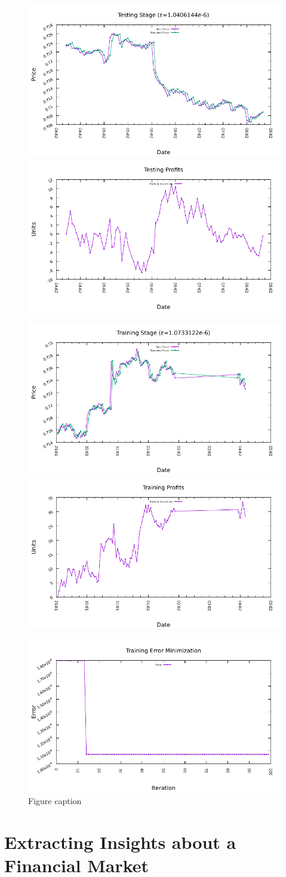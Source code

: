 \begin{figure}[htp]
\centering
\includegraphics[width=.3\textwidth]{img/plots/aud_usd_h1-10agents-10rules-20ind-100gen_testing_fit.pdf}\quad
\includegraphics[width=.3\textwidth]{img/plots/aud_usd_h1-10agents-10rules-20ind-100gen_testing_profits.pdf}

\medskip

\includegraphics[width=.3\textwidth]{img/plots/aud_usd_h1-10agents-10rules-20ind-100gen_training_fit.pdf}\quad
\includegraphics[width=.3\textwidth]{img/plots/aud_usd_h1-10agents-10rules-20ind-100gen_training_profits.pdf}

\medskip

\includegraphics[width=.3\textwidth]{img/plots/aud_usd_h1-10agents-10rules-20ind-100gen_error_minimization.pdf}

\caption{Figure caption}
\label{pics:blablabla}
\end{figure}

\section{Extracting Insights about a Financial Market}
\label{section:extracting-insights-about-a-financial-market}

